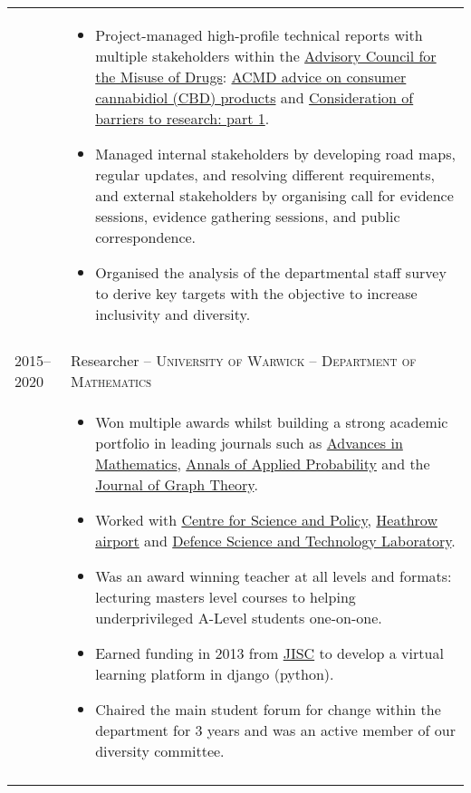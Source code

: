 \documentclass[a4paper,10pt]{article}
\begin{document}
\begin{tabular}{p{2.25cm}|p{15cm}}
 	 & \vspace{-0.07 in}\begin{itemize}
 	 	\item Project-managed high-profile technical reports with multiple stakeholders within the \href{https://www.gov.uk/government/organisations/advisory-council-on-the-misuse-of-drugs}{Advisory Council for the Misuse of Drugs}: \href{https://www.gov.uk/government/publications/acmd-advice-on-consumer-cannabidiol-cbd-products}{ACMD advice on consumer cannabidiol (CBD) products} and \href{https://www.gov.uk/government/publications/consideration-of-barriers-to-research-part-1}{Consideration of barriers to research: part 1}.
 	 	\item Managed internal stakeholders by developing road maps, regular updates, and resolving different requirements, and external stakeholders by organising call for evidence sessions, evidence gathering sessions, and public correspondence.
 	 	\item Organised the analysis of the departmental staff survey to derive key targets with the objective to increase inclusivity and diversity.
	\end{itemize}\vspace{-0.15 in}\\
\multicolumn{2}{c}{} \\
%
%
	\textsc{2015--2020} & \large{Researcher -- \textsc{University of Warwick} -- \textsc{Department of Mathematics}}\\
	 & \vspace{-0.07 in}\begin{itemize}
	\item Won multiple awards whilst building a strong academic portfolio in leading journals such as \href{https://www.sciencedirect.com/science/article/pii/S0001870818303347}{Advances in Mathematics}, \href{https://projecteuclid.org/journals/annals-of-applied-probability/volume-32/issue-1/From-the-Bernoulli-factory-to-a-dice-enterprise-via-perfect/10.1214/21-AAP1679.short}{Annals of Applied Probability} and the \href{http://onlinelibrary.wiley.com/doi/10.1002/jgt.22002/abstract}{Journal of Graph Theory}.
	\item Worked with \href{https://www.csap.cam.ac.uk/}{Centre for Science and Policy}, \href{https://www.heathrow.com/}{Heathrow airport} and \href{https://www.gov.uk/government/organisations/defence-science-and-technology-laboratory}{Defence Science and Technology Laboratory}.
	\item Was an award winning teacher at all levels and formats: lecturing masters level courses to helping underprivileged A-Level students one-on-one.
	\item Earned funding in 2013 from \href{https://www.jisc.ac.uk/}{JISC} to develop a virtual learning platform in django (python).
	\item Chaired the main student forum for change within the department for 3 years and was an active member of our diversity committee.
\end{itemize}\vspace{-0.15 in}\\
\multicolumn{2}{c}{} \\
\end{tabular}
\end{document}
